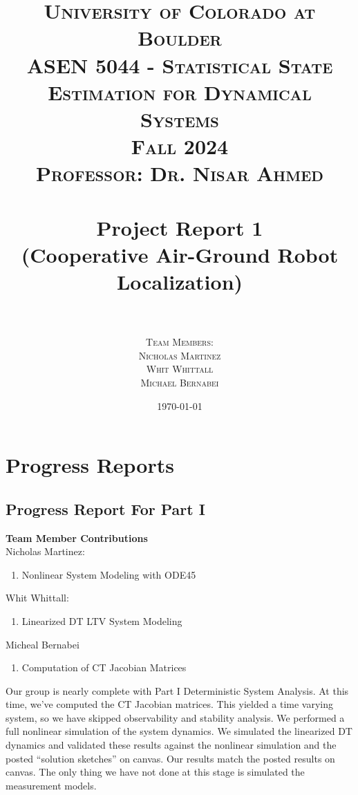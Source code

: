 \documentclass[paper=a4, fontsize=11pt]{scrartcl} %
\title{
\normalfont \LARGE
\textsc{University of Colorado at Boulder} \\ [25pt] %
\textsc{ASEN 5044 - Statistical State Estimation for Dynamical Systems} \\ [20pt]
\textsc{Fall 2024} \\ [20pt]
\textsc{Professor: Dr. Nisar Ahmed} \\ [12pt]
\horrule{1pt} \\[0.4cm] %
\huge Project Report 1 \\ %
\huge (Cooperative Air-Ground Robot Localization) \\ 
\horrule{1pt} \\[0.6cm] %
}
\author{
  \textsc{ Team Members:} \\ [4 mm]
  \textsc{ Nicholas Martinez}\\[2mm]
  \textsc{ Whit Whittall } \\[2mm]
  \textsc{ Michael Bernabei}\\[2mm]
}
\date{\normalsize\today} %
\numberwithin{equation}{section} %
\numberwithin{figure}{section} %
\numberwithin{table}{section} %
\begin{document}
\maketitle %
\thispagestyle{empty} %
\newpage

\tableofcontents

\listoffigures

\listofalgorithms

\newpage

%

\section{Progress Reports}
\subsection{Progress Report For Part I}
\begin{framed}

\textbf{Team Member Contributions} \\
Nicholas Martinez:
\begin{enumerate}
    \item Nonlinear System Modeling with ODE45
\end{enumerate}
Whit Whittall:
\begin{enumerate}
    \item Linearized DT LTV System Modeling
\end{enumerate}
Micheal Bernabei
\begin{enumerate}
    \item Computation of CT Jacobian Matrices
\end{enumerate}

Our group is nearly complete with Part I Deterministic System Analysis. At this time, we’ve computed the CT Jacobian matrices. This yielded a time varying system, so we have skipped observability and stability analysis. We performed a full nonlinear simulation of the system dynamics. We simulated the linearized DT dynamics and validated these results against the nonlinear simulation and the posted “solution sketches” on canvas. Our results match the posted results on canvas. The only thing we have not done at this stage is simulated the measurement models.

\end{framed}
\end{document}
